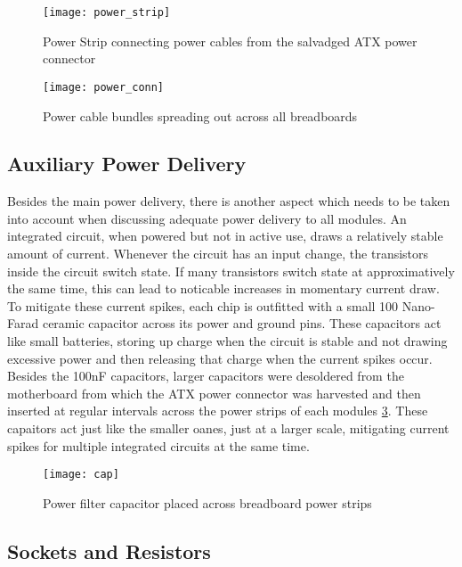 \begin{figure}[ht]
  \centering
  \texttt{[image: power\_strip]}
  \caption{Power Strip connecting power cables from the salvadged ATX power connector}
  \label{power_strip}
\end{figure}

\begin{figure}[ht]
  \centering
  \texttt{[image: power\_conn]}
  \caption{Power cable bundles spreading out across all breadboards}
  \label{power_conn}
\end{figure}


\subsection{Auxiliary Power Delivery}
Besides the main power delivery, there is another aspect which needs to be taken into account when
discussing adequate power delivery to all modules. An integrated circuit, when powered but not in
active use, draws a relatively stable amount of current. Whenever the circuit has an input change,
the transistors inside the circuit switch state. If many transistors switch state at
approximatively the same time, this can lead to noticable increases in momentary current draw. To
mitigate these current spikes, each chip is outfitted with a small 100 Nano-Farad ceramic
capacitor across its power and ground pins. These capacitors act like small batteries,
storing up charge when the circuit is stable and not drawing excessive power and then releasing
that charge when the current spikes occur. Besides the 100nF capacitors, larger capacitors were
desoldered from the motherboard from which the ATX power connector was harvested and then inserted
at regular intervals across the power strips of each modules \ref{cap}. These capaitors act just
like the smaller oanes, just at a larger scale, mitigating current spikes for multiple integrated
circuits at the same time.

\begin{figure}[ht]
  \centering
  \texttt{[image: cap]}
  \caption{Power filter capacitor placed across breadboard power strips}
  \label{cap}
\end{figure}

\subsection{Sockets and Resistors}


